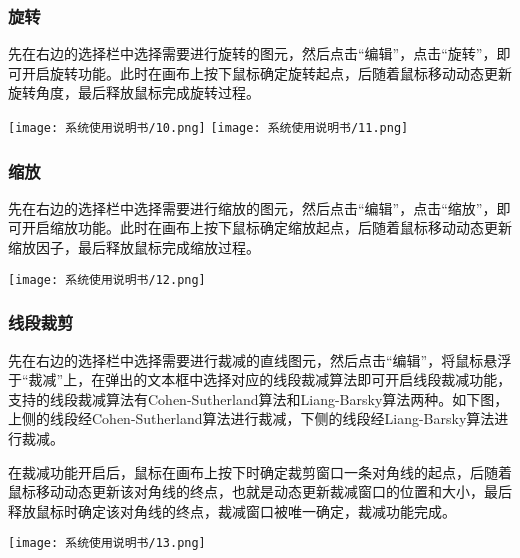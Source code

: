 \documentclass{article}
\begin{document}
		\subsubsection{旋转}
		先在右边的选择栏中选择需要进行旋转的图元，然后点击“编辑”，点击“旋转”，即可开启旋转功能。此时在画布上按下鼠标确定旋转起点，后随着鼠标移动动态更新旋转角度，最后释放鼠标完成旋转过程。
		\begin{center}
			\texttt{[image: 系统使用说明书/10.png]}
			\texttt{[image: 系统使用说明书/11.png]}
		\end{center}
		
		\subsubsection{缩放}
		先在右边的选择栏中选择需要进行缩放的图元，然后点击“编辑”，点击“缩放”，即可开启缩放功能。此时在画布上按下鼠标确定缩放起点，后随着鼠标移动动态更新缩放因子，最后释放鼠标完成缩放过程。
		\begin{center}
			\texttt{[image: 系统使用说明书/12.png]}
		\end{center}
	
		\subsubsection{线段裁剪}
		先在右边的选择栏中选择需要进行裁减的直线图元，然后点击“编辑”，将鼠标悬浮于“裁减”上，在弹出的文本框中选择对应的线段裁减算法即可开启线段裁减功能，支持的线段裁减算法有Cohen-Sutherland算法和Liang-Barsky算法两种。如下图，上侧的线段经Cohen-Sutherland算法进行裁减，下侧的线段经Liang-Barsky算法进行裁减。
		
		在裁减功能开启后，鼠标在画布上按下时确定裁剪窗口一条对角线的起点，后随着鼠标移动动态更新该对角线的终点，也就是动态更新裁减窗口的位置和大小，最后释放鼠标时确定该对角线的终点，裁减窗口被唯一确定，裁减功能完成。
		\begin{center}
			\texttt{[image: 系统使用说明书/13.png]}
		\end{center}
\end{document}
